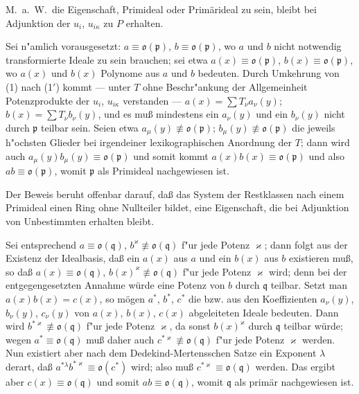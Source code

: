 \documentclass[12pt,a4paper]{article}
\begin{document}
{M.~a.~W.~die Eigenschaft, Primideal oder Prim\"{a}rideal zu sein, bleibt
bei Adjunktion der $u_{i}$, $u_{i\kappa}$ zu $P$ erhalten.

Sei n"{a}mlich vorausgesetzt: $a\equiv\mathfrak{o}(\mathfrak{p})$, $b\equiv\mathfrak{o}(\mathfrak{p})$, wo $a$ und $b$ nicht
notwendig transformierte Ideale zu sein brauchen; sei etwa $a(x)\equiv\mathfrak{o}(\mathfrak{p})$,
$b(x)\equiv\mathfrak{o}(\mathfrak{p})$, wo $a(x)$ und $b(x)$ Polynome aus $a$ und $b$ bedeuten.
Durch Umkehrung von (1) nach (1$'$) kommt --- unter $T$ ohne Beschr"{a}nkung
der Allgemeinheit Potenzprodukte der $u_{i}$, $u_{i\kappa}$ verstanden ---
$a(x)=\sum T_{\nu}a_{\nu}(y)$; $b(x)=\sum T_{\nu}b_{\nu}(y)$,
und es mu{\ss} mindestens ein $a_{\nu}(y)$ und ein $b_{\nu}(y)$ nicht durch $\mathfrak{p}$ teilbar
sein. Seien etwa $a_{\mu}(y)\not\equiv\mathfrak{o}(\mathfrak{p})$; $b_{\mu}(y)\not\equiv\mathfrak{o}(\mathfrak{p})$ die jeweils h"{o}chsten Glieder
bei irgendeiner lexikographischen Anordnung der $T$; dann wird auch
$a_{\mu}(y)b_{\mu}(y)\equiv\mathfrak{o}(\mathfrak{p})$ und somit kommt $a(x)b(x)\equiv\mathfrak{o}(\mathfrak{p})$ und also $ab\equiv\mathfrak{o}(\mathfrak{p})$,
womit $\mathfrak{p}$ als Primideal nachgewiesen ist.

Der Beweis beruht offenbar darauf, da{\ss} das System der Restklassen nach
einem Primideal einen Ring ohne Nullteiler bildet, eine Eigenschaft, die
bei Adjunktion von Unbestimmten erhalten bleibt.

Sei entsprechend $a\equiv\mathfrak{o}(\mathfrak{q})$, $b^{\varkappa}\not\equiv\mathfrak{o}(\mathfrak{q})$ f"{u}r jede Potenz $\varkappa$; dann folgt
aus der Existenz der Idealbasis, da{\ss} ein $a(x)$ aus $a$ und ein $b(x)$
aus $b$ existieren mu{\ss}, so da{\ss} $a(x)\equiv\mathfrak{o}(\mathfrak{q})$, $b(x)^{\varkappa}\not\equiv\mathfrak{o}(\mathfrak{q})$ f"{u}r jede Potenz $\varkappa$
wird; denn bei der entgegengesetzten Annahme w\"{u}rde eine Potenz von $b$
durch $\mathfrak{q}$ teilbar. Setzt man $a(x)b(x)=c(x)$, so m\"{o}gen $a^{*}$, $b^{*}$, $c^{*}$ die bzw.
aus den Koeffizienten $a_{\nu}(y)$, $b_{\nu}(y)$, $c_{\nu}(y)$ von $a(x)$, $b(x)$, $c(x)$ abgeleiteten Ideale
bedeuten. Dann wird $b^{*\varkappa}\not\equiv\mathfrak{o}(\mathfrak{q})$ f"{u}r jede Potenz $\varkappa$, da sonst $b(x)^{\varkappa}$
durch $\mathfrak{q}$ teilbar w\"{u}rde; wegen $a^{*}\equiv\mathfrak{o}(\mathfrak{q})$ mu{\ss} daher auch $c^{*\varkappa}\not\equiv\mathfrak{o}(\mathfrak{q})$
f"{u}r jede Potenz $\varkappa$ werden. Nun existiert aber nach dem Dedekind-Mertensschen
Satze ein Exponent $\lambda$ derart, da{\ss} $a^{*\lambda}b^{*\varkappa}\equiv\mathfrak{o}(c^{*})$ wird; also mu{\ss}
$c^{*\varkappa}\equiv\mathfrak{o}(\mathfrak{q})$ werden. Das ergibt aber $c(x)\equiv\mathfrak{o}(\mathfrak{q})$ und somit
$ab\equiv\mathfrak{o}(\mathfrak{q})$, womit $\mathfrak{q}$ als prim\"{a}r nachgewiesen ist.

}
\end{document}
